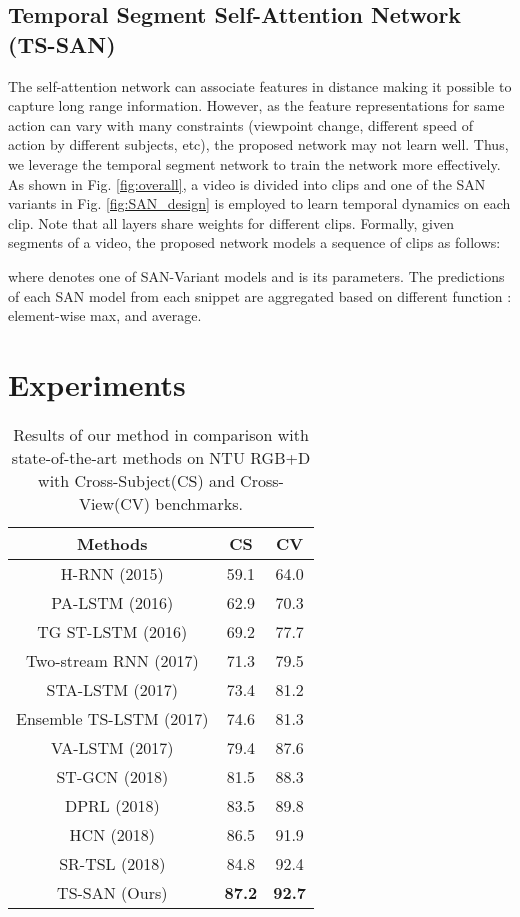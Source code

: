 \documentclass[10pt,twocolumn,letterpaper]{article}
\begin{document}
\subsection{Temporal Segment Self-Attention Network (TS-SAN)}
The self-attention network can associate features in distance making it possible to capture long range information. However, as the feature representations for same action can vary with many constraints (viewpoint change, different speed of action by different subjects, etc), the proposed network may not learn well. Thus, we leverage the temporal segment network \cite{intro_TSN} to train the network more effectively. As shown in Fig. \ref{fig:overall}, a video is divided into  clips and one of the SAN variants in Fig. \ref{fig:SAN_design} is employed to learn temporal dynamics on each clip. Note that all layers share weights for different clips.
Formally, given  segments  of a video, the proposed network models a sequence of clips as follows:

where  denotes one of SAN-Variant models and  is its parameters. The predictions of each SAN model from each snippet are aggregated based on different function : element-wise max, and average. 

\section{Experiments}

\begin{table}[!t]
	\begin{center}
	\begin{tabular}{|c|c|c|}
		\hline
		Methods & CS & CV\\
		\hline
		H-RNN \cite{STOA:H-RNN} (2015) & 59.1 & 64.0\\
		PA-LSTM \cite{STOA:PA-LSTM} (2016) & 62.9 & 70.3\\
		TG ST-LSTM \cite{STOA:TG_ST-LSTM} (2016) & 69.2 & 77.7\\
		Two-stream RNN \cite{STOA:Two-stream_RNN} (2017) & 71.3 & 79.5\\
		STA-LSTM \cite{STOA:STA-LSTM} (2017) & 73.4 & 81.2\\
		Ensemble TS-LSTM \cite{STOA:ENS_TS-LSTM} (2017) & 74.6 & 81.3\\
		VA-LSTM \cite{STOA:VA-LSTM} (2017) & 79.4 & 87.6\\
		ST-GCN \cite{STOA:stgcn} (2018) & 81.5 & 88.3\\
		DPRL \cite{STOA:DPRL} (2018)     & 83.5 & 89.8\\
		HCN  \cite{STOA:HCN} (2018)     & 86.5 & 91.9\\
		SR-TSL  \cite{STOA:SR-TSL} (2018)     & 84.8 & 92.4\\
		\hline
		TS-SAN (Ours)  & \textbf{87.2}  & \textbf{92.7}  \\
		\hline
	\end{tabular}
	\end{center}
	\vspace{-0.15in}
	\caption{Results of our method in comparison with state-of-the-art methods on NTU RGB+D with Cross-Subject(CS) and Cross-View(CV) benchmarks.}
	\label{tab:ntud}
\end{table}
\end{document}
